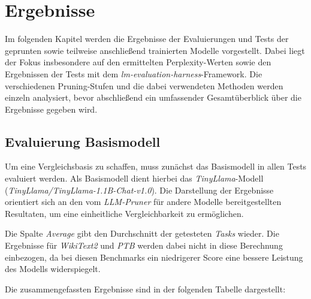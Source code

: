 \section{Ergebnisse}

Im folgenden Kapitel werden die Ergebnisse der Evaluierungen und Tests der
geprunten sowie teilweise anschließend trainierten Modelle vorgestellt. Dabei
liegt der Fokus insbesondere auf den ermittelten Perplexity-Werten sowie den
Ergebnissen der Tests mit dem \emph{lm-evaluation-harness}-Framework. Die
verschiedenen Pruning-Stufen und die dabei verwendeten Methoden werden einzeln
analysiert, bevor abschließend ein umfassender Gesamtüberblick über die
Ergebnisse gegeben wird.

\subsection{Evaluierung Basismodell}

Um eine Vergleichsbasis zu schaffen, muss zunächst das Basismodell in allen
Tests evaluiert werden. Als Basismodell dient hierbei das
\emph{TinyLlama}-Modell (\emph{TinyLlama/TinyLlama-1.1B-Chat-v1.0}). Die
Darstellung der Ergebnisse orientiert sich an den vom \emph{LLM-Pruner} für
andere Modelle bereitgestellten Resultaten, um eine einheitliche
Vergleichbarkeit zu ermöglichen.

Die Spalte \emph{Average} gibt den Durchschnitt der getesteten \emph{Tasks}
wieder. Die Ergebnisse für \emph{WikiText2} und \emph{PTB} werden dabei nicht in
diese Berechnung einbezogen, da bei diesen Benchmarks ein niedrigerer Score eine
bessere Leistung des Modells widerspiegelt.

Die zusammengefassten Ergebnisse sind in der folgenden Tabelle
dargestellt:

\begin{table}[h]
	\centering
	\caption{Evaluierung des Basismodells}
	\label{tab:pruning}
\end{table}


